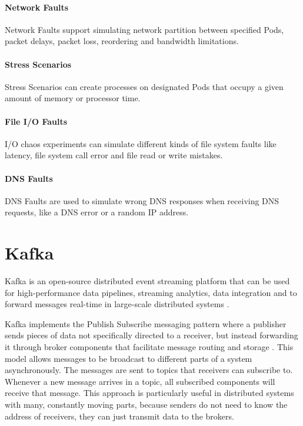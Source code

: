 \paragraph{Network Faults} Network Faults support simulating network partition between specified Pods, packet delays, packet loss, reordering and bandwidth limitations.

\paragraph{Stress Scenarios} Stress Scenarios can create processes on designated Pods that occupy a given amount of memory or processor time.

\paragraph{File I/O Faults} I/O chaos experiments can simulate different kinds of file system faults like latency, file system call error and file read or write mistakes.

\paragraph{DNS Faults} DNS Faults are used to simulate wrong DNS responses when receiving DNS requests, like a DNS error or a random IP address.

\section{Kafka} \label{background-kafka}

Kafka is an open-source distributed event streaming platform that can be used for high-performance data pipelines, streaming analytics, data integration and to forward messages real-time in large-scale distributed systems \cite{Kafka}.

Kafka implements the Publish Subscribe messaging pattern where a publisher sends pieces of data not specifically directed to a receiver, but instead forwarding it through broker components that facilitate message routing and storage \cite{KafkaDefinitive}. This model allows messages to be broadcast to different parts of a system asynchronously. The messages are sent to topics that receivers can subscribe to. Whenever a new message arrives in a topic, all subscribed components will receive that message. This approach is particularly useful in distributed systems with many, constantly moving parts, because senders do not need to know the address of receivers, they can just transmit data to the brokers.


